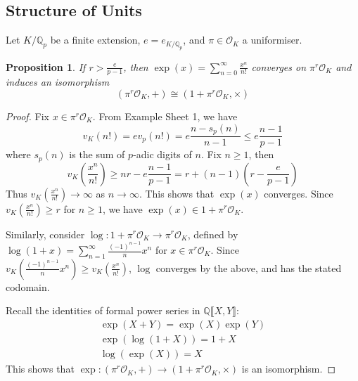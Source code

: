 \documentclass[11pt]{article}
\theoremstyle{definition}
\theoremstyle{plain}
\newtheorem{proposition}[definition]{Proposition}
\theoremstyle{remark}
\newcommand{\QQ}{\mathbb{Q}}
\newcommand{\cO}{\mathcal{O}}
\begin{document}
\subsection*{Structure of Units}

Let $K / \QQ_p$ be a finite extension, $e = e_{K/\QQ_p}$, and $\pi \in \cO_K$ a uniformiser.

\begin{proposition}\label{prop:13_9}
    If $r > \frac{e}{p-1}$, then $\exp(x) = \sum_{n=0}^\infty \frac{x^n}{n!}$ converges on $\pi^r \cO_K$ and induces an isomorphism
    \begin{equation*}
        (\pi^r \cO_K, +) \cong (1 + \pi^r \cO_K, \times)
    \end{equation*}
\end{proposition}
\begin{proof}
    Fix $x \in \pi^r \cO_K$. From Example Sheet 1, we have
    \begin{equation*}
        v_K(n!) = e v_p(n!) = e \frac{n - s_p(n)}{n-1} \le e \frac{n-1}{p-1}
    \end{equation*}
    where $s_p(n)$ is the sum of $p$-adic digits of $n$. Fix $n \ge 1$, then
    \begin{equation*}
        v_K\left(\frac{x^n}{n!}\right) \ge nr - e \frac{n-1}{p-1} = r + (n-1)\left(r - \frac{e}{p-1}\right)
    \end{equation*}
    Thus $v_K\left(\frac{x^n}{n!}\right) \to \infty$ as $n \to \infty$. This shows that $\exp(x)$ converges. Since $v_K\left(\frac{x^n}{n!}\right) \ge r$ for $n \ge 1$, we have $\exp(x) \in 1 + \pi^r \cO_K$.

    Similarly, consider $\log : 1 + \pi^r \cO_K \to \pi^r \cO_K$, defined by $\log(1 + x) = \sum_{n=1}^\infty \frac{(-1)^{n-1}}{n} x^n$ for $x \in \pi^r \cO_K$. Since $v_K\left(\frac{(-1)^{n-1}}{n} x^n\right) \ge v_K\left(\frac{x^n}{n!}\right)$, $\log$ converges by the above, and has the stated codomain.

    Recall the identities of formal power series in $\QQ \llbracket X, Y \rrbracket$:
    \begin{gather*}
        \exp(X + Y) = \exp(X) \exp(Y)\\
        \exp(\log(1+X)) = 1 + X\\
        \log(\exp(X)) = X
    \end{gather*}
    This shows that $\exp : (\pi^r \cO_K, +) \to (1 + \pi^r \cO_K, \times)$ is an isomorphism.
\end{proof}
\end{document}
